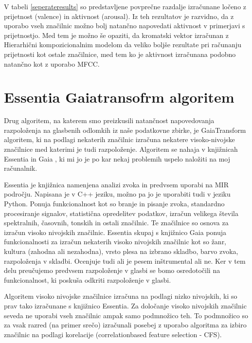 \documentclass[a4paper, 12pt]{book}
\begin{document}
{V tabeli \ref{seperateresults} so predstavljene povprečne razdalje  izračunane ločeno z prijetnost (valence) in aktivnost (arousal). Iz teh rezultatov je razvidno, da z uporabo vseh značilnic možno bolj natančno  napovedati aktivnost v primerjavi s prijetnostjo. Med tem je možno še opaziti, da kromatski vektor izračunan z Hierarhični kompozicionalnim modelom da veliko boljše rezultate pri računanju prijetnosti kot ostale značilnice, med tem ko je aktivnost izračunana podobno natančno kot z uporabo MFCC. 



\section{Essentia Gaiatransofrm algoritem}

Drug algoritem, na katerem smo preizkusili natančnost napovedovanja razpoloženja na glasbenih odlomkih iz naše podatkovne zbirke, je GaiaTransform algoritem, ki na podlagi nekaterih značilnic izračuna nekatere visoko-nivojske značilnice \cite{bogdanov2013form} med katerimi je tudi razpoloženje. Algoritem se nahaja v knjižnicah Essentia in Gaia \cite{bogdanov2013essentia}, ki mi jo je po kar nekaj problemih uspelo naložiti na moj računalnik. 

Essentia je knjižnica namenjena analizi zvoka in predvsem uporabi na MIR področju. Napisana je v C++ jeziku, možno pa jo je uporabiti tudi v jeziku Python. Ponuja funkcionalnost kot so branje in pisanje zvoka, standardno procesiranje signalov, statistična opredelitev podatkov, izračun velikega števila spektralnih, časovnih, tonskih in ostali značilnic. Te značilnice so osnova za izračun visoko nivojskih značilnic. Essentia skupaj s knjižnico Gaia ponuja funkcionalnosti za izračun nekaterih visoko nivojskih značilnic kot so žanr, kultura (zahodna ali nezahodna), vrsto plesa na izbrano skladbo, barvo zvoka, razpoloženja v skladbi. Ocenjuje tudi ali je pesem inštrumental ali ne. Ker v tem delu preučujemo predvsem razpoloženje v glasbi se bomo osredotočili na funkcionalnost, ki poskuša odkriti razpoloženje v glasbi.

Algoritem visoko nivojske značilnice izračuna na podlagi nizko nivojskih, ki so prav tako izračunane s knjižnico Essentia. Za določanje visoko nivojskih značilnic seveda ne uporabi vseh značilnic ampak samo podmnožico teh. To podmnožico so za vsak razred (na primer srečo) izračunali posebej z uporabo algoritma za izbiro značilnic na podlagi korelacije (correlationbased feature selection - CFS). 

}
\end{document}
